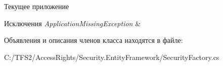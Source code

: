 Текущее приложение 


\begin{DoxyExceptions}{Исключения}
{\em Application\+Missing\+Exception} & \\
\hline
\end{DoxyExceptions}


Объявления и описания членов класса находятся в файле\+:\begin{DoxyCompactItemize}
\item 
C\+:/\+T\+F\+S2/\+Access\+Rights/\+Security.\+Entity\+Framework/Security\+Factory.\+cs\end{DoxyCompactItemize}
